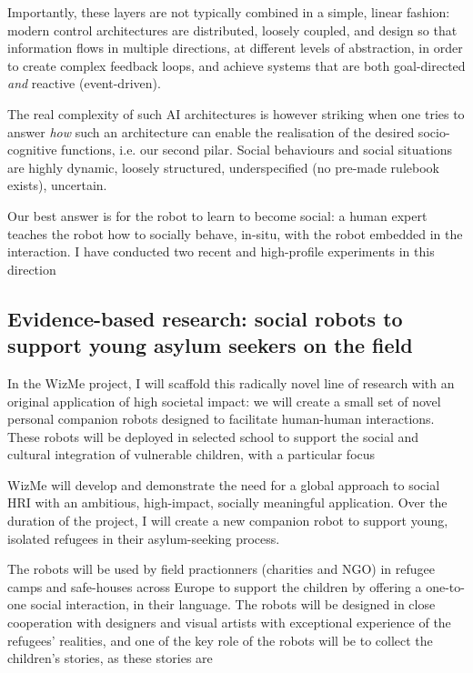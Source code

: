\documentclass[]{article}
\newcommand{\project}{WizMe\xspace}
\begin{document}
Importantly, these layers are not typically combined in a simple, linear
fashion: modern control architectures are distributed, loosely coupled, and
design so that information flows in multiple directions, at different levels of
abstraction, in order to create complex feedback loops, and achieve systems that are
both goal-directed \emph{and} reactive (event-driven).


The real complexity of such AI architectures is however striking when one tries
to answer \emph{how} such an architecture can enable the realisation of the
desired socio-cognitive functions, i.e. our second pilar. Social behaviours and
social situations are highly dynamic, loosely structured, underspecified (no
pre-made rulebook exists), uncertain.

Our best answer is for the robot to learn to become social: a human expert teaches
the robot how to socially behave, in-situ, with the robot embedded in the
interaction. I have conducted two recent and high-profile experiments in this
direction

\subsection{Evidence-based research: social robots
to support young asylum seekers on the field}


In the \project project, I will scaffold this radically novel line of
research with an original application of high societal impact: we will create a
small set of novel personal companion robots designed to facilitate human-human
interactions. These robots will be deployed in selected school to support the
social and cultural integration of vulnerable children, with a particular focus



\project will develop and demonstrate the need for a global approach to social
HRI with an ambitious, high-impact, socially meaningful application. Over the
duration of the project, I will create a new companion robot to support young,
isolated refugees in their asylum-seeking process.

The robots will be used by field practionners (charities and NGO) in refugee
camps and safe-houses across Europe to support the children by offering a
one-to-one social interaction, in their language. The robots will be designed in
close cooperation with designers and visual artists with exceptional experience
of the refugees' realities, and one of the key role of the robots will be to
collect the children's stories, as these stories are
\end{document}
